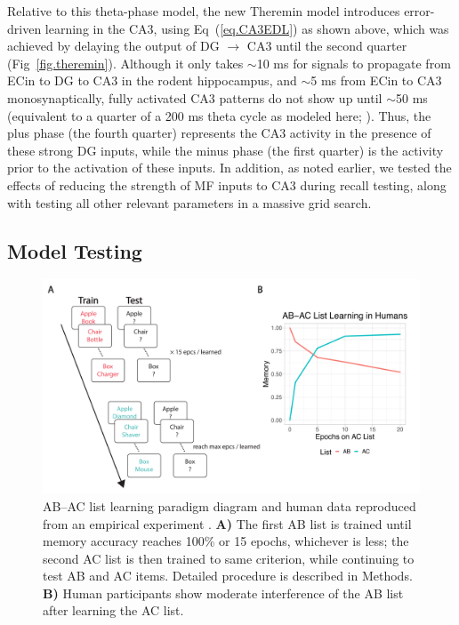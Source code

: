 \documentclass[11pt,twoside]{article}
\newif\myifpdf
\begin{document}
Relative to this theta-phase model, the new Theremin model introduces error-driven learning in the CA3, using Eq~(\ref{eq.CA3EDL}) as shown above, which was achieved by delaying the output of DG $\rightarrow$ CA3 until the second quarter (Fig~\ref{fig.theremin}).  Although it only takes $\sim$10 ms for signals to propagate from ECin to DG to CA3 in the rodent hippocampus, and $\sim$5 ms from ECin to CA3 monosynaptically, fully activated CA3 patterns do not show up until $\sim$50 ms (equivalent to a quarter of a 200 ms theta cycle as modeled here; \citealp{NakagamiSaitoMatsuki97}).  Thus, the plus phase (the fourth quarter) represents the CA3 activity in the presence of these strong DG inputs, while the minus phase (the first quarter) is the activity prior to the activation of these inputs.  In addition, as noted earlier, we tested the effects of reducing the strength of MF inputs to CA3 during recall testing, along with testing all other relevant parameters in a massive grid search.

\subsection{Model Testing}

\begin{figure}
  \centering\includegraphics[width=5in]{fig_hip_edl_abac}
  \caption{\footnotesize AB--AC list learning paradigm diagram and human data reproduced from an empirical experiment \citep{BarnesUnderwood59}. \textbf{A)} The first AB list is trained until memory accuracy reaches 100\% or 15 epochs, whichever is less; the second AC list is then trained to same criterion, while continuing to test AB and AC items.  Detailed procedure is described in Methods. \textbf{B)} Human participants show moderate interference of the AB list after learning the AC list.}
\label{fig.abac}
\end{figure}
\end{document}
